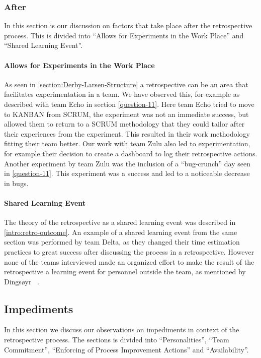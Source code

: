 \subsubsection{After}
In this section is our discussion on factors that take place after the retrospective process. This is divided into ``Allows for Experiments in the Work Place'' and ``Shared Learning Event''. 

\paragraph{Allows for Experiments in the Work Place}
As seen in \autoref{section:Derby-Larsen-Structure} a retrospective can be an area that facilitates experimentation in a team. We have observed this, for example as described with team Echo in section \autoref{question-11}. Here team Echo tried to move to KANBAN from SCRUM, the experiment was not an immediate success, but allowed them to return to a SCRUM methodology that they could tailor after their experiences from the experiment. This resulted in their work methodology fitting their team better. Our work with team Zulu also led to experimentation, for example their decision to create a dashboard to log their retrospective actions. Another experiment by team Zulu was the inclusion of a ``bug-crunch'' day seen in \autoref{question-11}. This experiment was a success and led to a noticeable decrease in bugs.

\paragraph{Shared Learning Event}
The theory of the retrospective as a shared learning event was described in \autoref{intro:retro-outcome}.  An example of a shared learning event from the same section was performed by team Delta, as they changed their time estimation practices to great success after discussing the process in a retrospective. However none of the teams interviewed made an organized effort to make the result of the retrospective a learning event for personnel outside the team, as mentioned by Dingsøyr ~\cite{Dingsoyr2004}.



\subsection{Impediments}
In this section we discuss our observations on impediments in context of the retrospective process. The sections is divided into ``Personalities'', ``Team Commitment'', ``Enforcing of Process Improvement Actions'' and ``Availability''.

